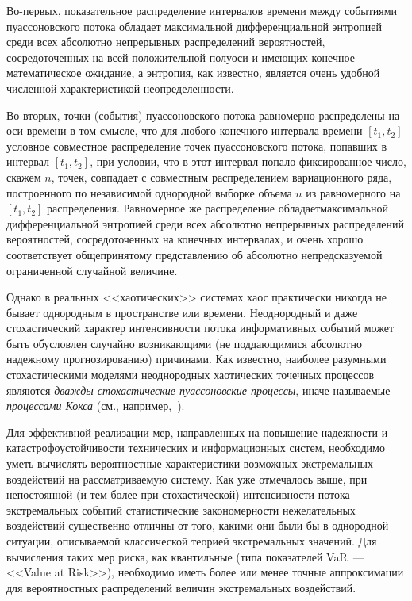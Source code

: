 \begin{multicols}{2}
Во-пер\-вых, показательное распределение ин\-тер\-ва\-лов
времени между событиями пуассоновского потока обладает максимальной
дифференциальной энтропией среди всех абсолютно непрерывных
распределений вероятностей, сосредоточенных на всей положительной
полуоси и имеющих конечное математическое ожидание, а энтропия, как
известно, является очень удобной численной характеристикой
неопределенности. 

Во-вто\-рых, точки (события) пуассоновского потока
равномерно распределены на оси времени в том смысле, что для любого
конечного интервала времени $[t_1,t_2]$ условное совместное
распределение точек пуассоновского потока, попавших в интервал
$[t_1,t_2]$, при условии, что в этот интервал попало фиксированное
число, скажем $n$, точек, совпадает с совместным распределением
вариационного ряда, построенного по независимой однородной выборке
объема $n$ из равномерного на $[t_1,t_2]$ распределения. Равномерное
же распределение обладает\linebreak максимальной дифференциальной энтропией
среди всех абсолютно непрерывных распределений вероят\-ностей,
сосредоточенных на конечных интервалах, и очень хорошо соответствует
общепринятому представлению об абсолютно непредсказуемой
ограниченной случайной величине.

Однако в реальных <<хаотических>> системах хаос практически никогда
не бывает однородным в пространстве или времени. Неоднородный и даже
стохастический характер интенсивности потока информативных событий
может быть обусловлен случайно возникающими (не поддающимися
абсолютно надежному прогнозированию) причинами. Как известно,
наиболее разумными стохастическими моделями неоднородных хаотических
точечных процессов являются {\it дважды стохастические пуассоновские
процессы}, иначе называемые {\it процессами Кокса} (см., например,~\cite{BeningKorolev2002}).

Для эффективной реализации мер, направленных на повышение надежности
и катастрофоустойчивости технических и информационных сис\-тем,
необходимо уметь вычислять вероятностные характеристики возможных
экстремальных воздействий на рассматриваемую систему. Как уже
отмечалось выше, при непостоянной (и тем более при стохастической)
интенсивности потока экстремальных событий статистические
закономерности нежелательных воздействий существенно отличны от
того, какими они были бы в однородной ситуации, описываемой
классической теорией экстремальных значений. Для вычисления таких
мер риска, как квантильные (типа показателей VaR~--- <<Value at
Risk>>), необходимо иметь более или менее точные аппроксимации для
вероятностных распределений величин экстремальных воздействий.


\end{multicols}
